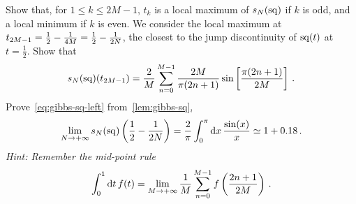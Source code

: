 \begin{Exercise}[title={Gibbs Phenomenon for the square wave},name={Problem},label=gibbs]
  \subQuestion Show that, for $1\leq k \leq 2M-1$, $t_k$ is a local maximum of $s_{N}(\operatorname{sq})$ if $k$ is odd, and a local
  minimum if $k$ is even.
  \subQuestion We consider the local maximum at $t_{2M-1}=\smash{\frac{1}{2}-\frac{1}{4M}}=\smash{\frac{1}{2}-\frac{1}{2N}}$, the closest to the jump discontinuity of $\operatorname{sq}(t)$ at $t=\frac12$. Show that
  \begin{equation}
    s_{N}(\operatorname{sq})(t_{2M-1})=\frac{2}{M}\sum_{n=0}^{M-1}\frac{2M}{\pi(2n+1)}\sin\left[\frac{\pi(2n+1)}{2M}\right]\,.
  \end{equation}
  \subQuestion Prove~\cref{eq:gibbs-sq-left} from~\cref{lem:gibbs-sq}, \ie
  \begin{equation}
    \lim_{N\to+\infty} s_{N}(\operatorname{sq})\left(\frac{1}{2}-\frac{1}{2N}\right)=
    \frac{2}{\pi}\int_0^{\pi}\mathrm{d} x\,\frac{\sin(x)}{x}\simeq 1+0.18\,.
  \end{equation}
  \emph{Hint: Remember the mid-point rule}
  \begin{equation}
    \int_0^1\mathrm{d} t\,f(t)=\lim_{M\to+\infty}\frac{1}{M}\sum_{n=0}^{M-1}f\left(\frac{2n+1}{2M}\right)\,.
  \end{equation}
\end{Exercise}
